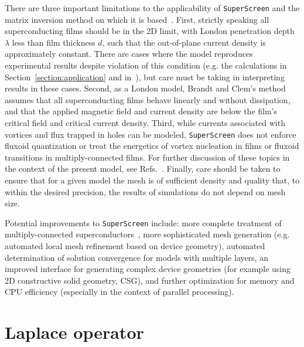 \documentclass[final,3p,times]{elsarticle}
\newcommand{\inline}[1]{\texttt{#1}\xspace}
\newcommand{\SuperScreen}{\inline{SuperScreen}}
\begin{document}
There are three important limitations to the applicability of \SuperScreen and the matrix inversion method on which it is based~\cite{Brandt_Clem_2004,brandt_thin_2005}. First, strictly speaking all superconducting films should be in the 2D limit, with London penetration depth $\lambda$ less than film thickness $d$, such that the out-of-plane current density is approximately constant. There are cases where the model reproduces experimental results despite violation of this condition (e.g. the calculations in Section~\ref{section:application} and in~\cite{kirtley_scanning_2016,kirtley_response_2016}), but care must be taking in interpreting results in these cases. Second, as a London model, Brandt and Clem's method assumes that all superconducting films behave linearly and without dissipation, and that the applied magnetic field and current density are below the film's critical field and critical current density. Third, while currents associated with vortices and flux trapped in holes can be modeled, \SuperScreen does not enforce fluxoid quantization or treat the energetics of vortex nucleation in films or fluxoid transitions in multiply-connected films. For further discussion of these topics in the context of the present model, see Refs.~\cite{Brandt_Clem_2004, Clem_Brandt_2005}. Finally, care should be taken to ensure that for a given model the mesh is of sufficient density and quality that, to within the desired precision, the results of simulations do not depend on mesh size.

Potential improvements to \SuperScreen include: more complete treatment of multiply-connected superconductors~\cite{Clem_Brandt_2005}, more sophisticated mesh generation (e.g. automated local mesh refinement based on device geometry), automated determination of solution convergence for models with multiple layers, an improved interface for generating complex device geometries (for example using 2D constructive solid geometry, CSG), and further optimization for memory and CPU efficiency (especially in the context of parallel processing).



\appendix

\section{Laplace operator}
\label{appendix:laplace}
\end{document}
